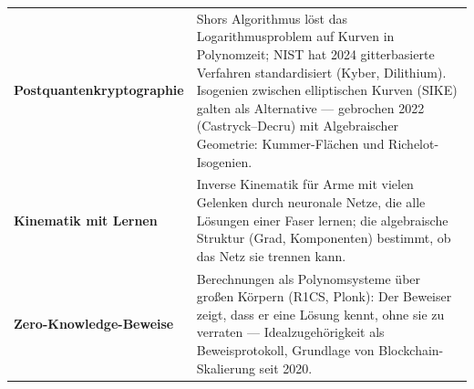 \begin{forschung}
\begin{center}
{\small
\renewcommand{\arraystretch}{1.45}
\begin{tabular}{@{}P{3.0cm}P{5.2cm}@{}}
\toprule
\textbf{Post\-quanten\-krypto\-graphie} & Shors Algorithmus löst das Logarithmusproblem auf Kurven in Polynomzeit; NIST hat 2024 gitterbasierte Verfahren standardisiert (Kyber, Dilithium). Isogenien zwischen elliptischen Kurven (SIKE) galten als Alternative --- gebrochen 2022 (Castryck--Decru) mit Algebraischer Geometrie: Kummer-Flächen und Richelot-Isogenien.\\
\textbf{Kinematik mit Lernen} & Inverse Kinematik für Arme mit vielen Gelenken durch neuronale Netze, die alle Lösungen einer Faser lernen; die algebraische Struktur (Grad, Komponenten) bestimmt, ob das Netz sie trennen kann.\\
\textbf{Zero-Knowledge-Beweise} & Berechnungen als Polynomsysteme über großen Körpern (R1CS, Plonk): Der Beweiser zeigt, dass er eine Lösung kennt, ohne sie zu verraten --- Idealzugehörigkeit als Beweisprotokoll, Grundlage von Blockchain-Skalierung seit 2020.\\
\bottomrule
\end{tabular}}
\end{center}

\begin{center}
\begin{minipage}{0.88\textwidth}
\end{minipage}
\end{center}
\end{forschung}

